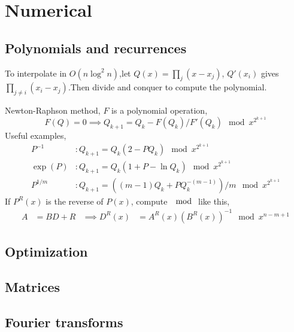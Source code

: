 \chapter{Numerical}

\section{Polynomials and recurrences}

  To interpolate in $O(n \log^2 n)$,let $Q(x) = \prod_{j}(x - x_j)$, $Q'(x_i)$
  gives $\prod_{j \neq i}(x_i - x_j) $.Then divide and conquer to compute the
  polynomial.


  Newton-Raphson method, $F$ is a polynomial operation,
  \[
	  F(Q) = 0 \implies Q_{k + 1} = Q_k - F(Q_k) / F'(Q_k) \mod x^{2^{k + 1}}
  \]
  Useful examples,
  \begin{align*}
	  P^{-1} &: Q_{k + 1} = Q_k(2 - PQ_k) \mod x^{2^{k + 1}}\\
	  \exp(P)&: Q_{k + 1} = Q_k(1 + P - \ln Q_k) \mod x^{2^{k + 1}}\\
	  P^{1/m}&: Q_{k + 1} = ((m - 1) Q_k + P Q_k^{-(m - 1)}) / m \mod x^{2^{k + 1}}
  \end{align*}
  If $P^R(x)$ is the reverse of $P(x)$, compute $\mod$ like this,
  \begin{align*}
	  A &= BD + R &\implies D^R(x) &= A^R(x) (B^R(x))^{-1} \mod x^{n - m + 1}
  \end{align*}

\section{Optimization}

\section{Matrices}

\section{Fourier transforms}
